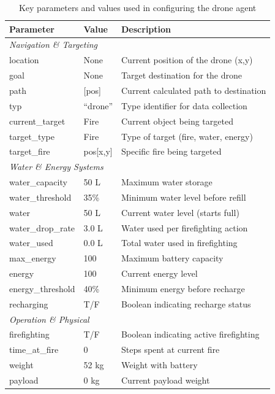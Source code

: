 \documentclass[11pt, a4paper]{article}
\begin{document}
\begin{table}[htbp]
\centering
\caption{Key parameters and values used in configuring the drone agent}
\label{tab:drone_parameters}
\begin{tabular}{@{}lll@{}}
\toprule
\textbf{Parameter} & \textbf{Value} & \textbf{Description} \\
\midrule
\multicolumn{3}{l}{\textit{Navigation \& Targeting}} \\
location & None & Current position of the drone (x,y) \\
goal & None & Target destination for the drone \\
path & [pos] & Current calculated path to destination \\
typ & ``drone'' & Type identifier for data collection \\
current\_target & Fire & Current object being targeted \\
target\_type & Fire & Type of target (fire, water, energy) \\
target\_fire & pos[x,y] & Specific fire being targeted \\
\midrule
\multicolumn{3}{l}{\textit{Water \& Energy Systems}} \\
water\_capacity & 50 L & Maximum water storage \citep{DJIAGRAST50} \\
water\_threshold & 35\% & Minimum water level before refill \\
water & 50 L & Current water level (starts full) \\
water\_drop\_rate & 3.0 L & Water used per firefighting action \\
water\_used & 0.0 L & Total water used in firefighting \\
max\_energy & 100 & Maximum battery capacity \\
energy & 100 & Current energy level \\
energy\_threshold & 40\% & Minimum energy before recharge \\
recharging & T/F & Boolean indicating recharge status \\
\midrule
\multicolumn{3}{l}{\textit{Operation \& Physical}} \\
firefighting & T/F & Boolean indicating active firefighting \\
time\_at\_fire & 0 & Steps spent at current fire \\
weight & 52 kg & Weight with battery \citep{DJIAGRAST50} \\
payload & 0 kg & Current payload weight \\

\end{tabular}
\end{table}
\end{document}

